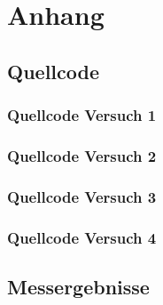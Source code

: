 \documentclass[TGAI_Laborbericht.tex]{subfiles}
\begin{document}
\chapter*{Anhang}
\label{chap:APPENDIX}
\addtocounter{chapter}{1}
\setcounter{section}{0}

\section{Quellcode}
\label{chap:APPENDIX_SOURCECODE}

\subsection{Quellcode Versuch 1}
\label{chap:APPENDIX_SOURCECODE_V1}

\subsection{Quellcode Versuch 2}
\label{chap:APPENDIX_SOURCECODE_V2}

\subsection{Quellcode Versuch 3}
\label{chap:APPENDIX_SOURCECODE_V3}

\subsection{Quellcode Versuch 4}
\label{chap:APPENDIX_SOURCECODE_V4}


\section{Messergebnisse}
\label{chap:APPENDIX_MEASUREMENT_SOURCE}


%
%

\clearpage
\end{document}

